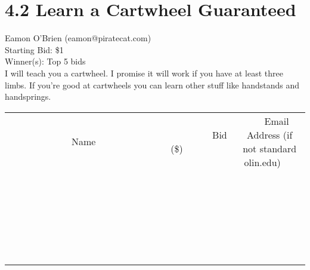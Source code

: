 \documentclass[11pt]{article}
\begin{document}
\section*{4.2 Learn a Cartwheel Guaranteed}
Eamon O'Brien (eamon@piratecat.com) \\
Starting Bid: \$1 \\
Winner(s): 
Top 5 bids \\
I will teach you a cartwheel. I promise it will work if you have at least three limbs. If you're good at cartwheels you can learn other stuff like handstands and handsprings. \\[6ex]
\begin{tabular}{c c c}
~~~~~~~~~~~~~Name~~~~~~~~~~~~~ & ~~~~~~~~~Bid (\$)~~~~~~~~~ & ~~~Email Address (if not standard olin.edu)~~~ \\
 & & \\
\hline
 & & \\
\hline
 & & \\
\hline
 & & \\
\hline
 & & \\
\hline
 & & \\
\hline
 & & \\
\hline
 & & \\
\hline
 & & \\
\hline
 & & \\
\hline
 & & \\
\hline
 & & \\
\hline
 & & \\
\hline
 & & \\
\hline
 & & \\
\hline
 & & \\
\hline
 & & \\
\hline
 & & \\
\hline
 & & \\
\hline
 & & \\
\hline
 & & \\
\hline
 & & \\
\hline
 & & \\
\hline
 & & \\
\hline
 & & \\
\hline
 & & \\
\hline
\end{tabular}
\clearpage
\end{document}
